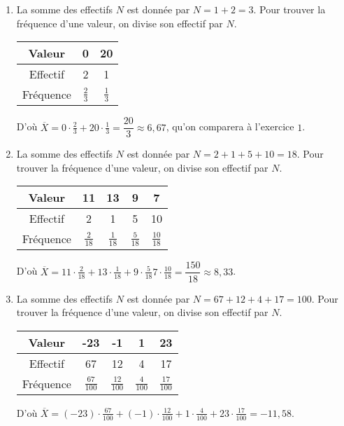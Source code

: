 {\begin{enumerate}
			La moyenne est la somme des produits Valeur $\times$ Fréquence.
			D'où $\overline{X} = 0 \cdot \frac13 + 20 \cdot \frac23 =\dfrac{40}3 \approx 13,33$, qu'on comparera à l'exercice $1$.
			
		\item 
			La somme des effectifs $N$ est donnée par $N = 1+2 = 3$.
			Pour trouver la fréquence d'une valeur, on divise son effectif par $N$.
			
			\begin{tabular}{|c|c|c|}\hline
			Valeur   & 0 & 20 \\ \hline
			Effectif & 2 & 1  \\ \hline
			Fréquence & $\frac23$ & $\frac13$ \\ \hline
			\end{tabular}
			
			D'où $\overline{X} = 0 \cdot \frac23 + 20 \cdot \frac13 =\dfrac{20}3 \approx 6,67$, qu'on comparera à l'exercice $1$.
			
		\item 
			La somme des effectifs $N$ est donnée par $N = 2+1+5+10 = 18$.
			Pour trouver la fréquence d'une valeur, on divise son effectif par $N$.
			
			\begin{tabular}{|c|c|c|c|c|}\hline
			Valeur   & 11 & 13 & 9 & 7 \\ \hline
			Effectif & 2 & 1 & 5 & 10 \\ \hline
			Fréquence & $\frac2{18}$ & $\frac1{18}$ & $\frac5{18}$ & $\frac{10}{18}$  \\ \hline
			\end{tabular}
			
			D'où $\overline{X} = 11\cdot\frac2{18} + 13\cdot \frac1{18} + 9\cdot \frac5{18} 7\cdot\frac{10}{18} = \dfrac{150}{18} \approx 8,33 $.
			
		\item 
			La somme des effectifs $N$ est donnée par $N = 67+12+4+17 = 100$.
			Pour trouver la fréquence d'une valeur, on divise son effectif par $N$.
			
			\begin{tabular}{|c|c|c|c|c|}\hline
			Valeur   & -23 & -1 & 1 & 23 \\ \hline
			Effectif & 67 & 12 & 4 & 17 \\ \hline
			Fréquence & $\frac{67}{100}$ & $\frac{12}{100}$ & $\frac{4}{100}$ & $\frac{17}{100}$ \\ \hline
			\end{tabular}
			
			D'où $\overline{X} = (-23) \cdot \frac{67}{100} + (-1)\cdot \frac{12}{100} + 1\cdot \frac{4}{100} + 23\cdot \frac{17}{100} = -11,58$.

	\end{enumerate}
}

